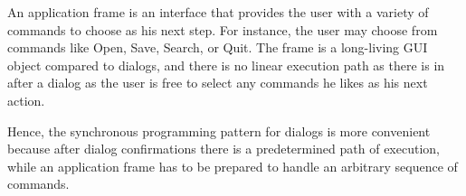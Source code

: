 \documentclass[twocolumn,a4paper]{article}
\newcommand {\concept} [1] {{\sl #1}\index{#1}}
\newcommand {\code}[1]{{\sffamily #1}}
\newcommand {\CLIM}{\textsc{clim}}
\let\method\code
\let\macro\code
\begin{document}


An application frame is an interface that provides the user with a
variety of commands to choose as his next step. For instance, the user
may choose from commands like Open, Save, Search, or Quit. The frame
is a long-living GUI object compared to dialogs, and there is no linear
execution path as there is in after a dialog as the user is free to
select any commands he likes as his next action.

Hence, the synchronous programming pattern for dialogs is more
convenient because after dialog confirmations there is a predetermined
path of execution, while an application frame has to be prepared to
handle an arbitrary sequence of commands.


\end{document}
